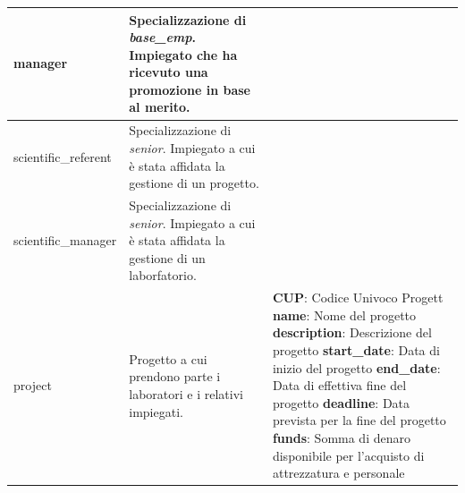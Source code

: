 \begin{longtable}{@{}| p{} | p{} | p{} |}
	\hline
	manager              & \begin{minipage}[t]{0.4\textwidth}
		                       \raggedright
		                       Specializzazione di \textit{base\_emp}. Impiegato che ha ricevuto una promozione in base al merito.
	                       \end{minipage}
	                     &                                                                                                                    \\[25pt]
	\hline
	scientific\_referent & \begin{minipage}[t]{0.4\textwidth}
		                       \raggedright
		                       Specializzazione di \textit{senior}. Impiegato a cui è stata affidata la gestione di un progetto.
	                       \end{minipage}
	                     &                                                                                                                    \\[25pt]
	\hline
	scientific\_manager  & \begin{minipage}[t]{0.4\textwidth}
		                       \raggedright
		                       Specializzazione di \textit{senior}.  Impiegato a cui è stata affidata la gestione di un laborfatorio.
	                       \end{minipage}
	                     &                                                                                                                    \\[25pt]
	\hline
	project              & \begin{minipage}[t]{0.4\textwidth}
		                       \raggedright
		                       Progetto a cui prendono parte i laboratori e i relativi impiegati.
	                       \end{minipage}
	                     & \begin{minipage}[t]{0.3\textwidth}
		                       \raggedright
		                       \textbf{CUP}: Codice Univoco Progett\sskip
		                       \textbf{name}: Nome del progetto\sskip
		                       \textbf{description}: Descrizione del progetto\sskip
		                       \textbf{start\_date}: Data di inizio del progetto\sskip
		                       \textbf{end\_date}: Data di effettiva fine del progetto\sskip
		                       \textbf{deadline}: Data prevista per la fine del progetto\sskip
		                       \textbf{funds}: Somma di denaro disponibile per l'acquisto di attrezzatura e personale

\end{minipage}
\end{longtable}
